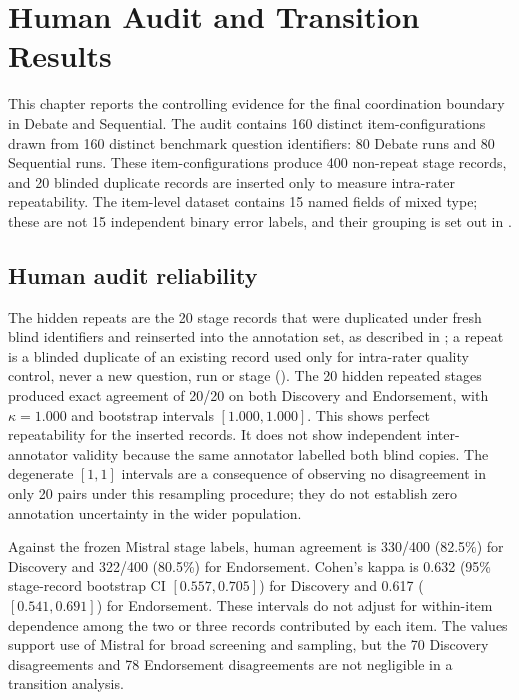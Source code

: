 \chapter{Human Audit and Transition Results}
\label{chap:human-results}

This chapter reports the controlling evidence for the final coordination boundary in Debate and Sequential. The audit contains 160 distinct item-configurations drawn from 160 distinct benchmark question identifiers: 80 Debate runs and 80 Sequential runs. These item-configurations produce 400 non-repeat stage records, and 20 blinded duplicate records are inserted only to measure intra-rater repeatability. The item-level dataset contains 15 named fields of mixed type; these are not 15 independent binary error labels, and their grouping is set out in .

\section{Human audit reliability}

The hidden repeats are the 20 stage records that were duplicated under fresh blind identifiers and reinserted into the annotation set, as described in ; a repeat is a blinded duplicate of an existing record used only for intra-rater quality control, never a new question, run or stage (). The 20 hidden repeated stages produced exact agreement of 20/20 on both Discovery and Endorsement, with $\kappa=1.000$ and bootstrap intervals $[1.000,1.000]$. This shows perfect repeatability for the inserted records. It does not show independent inter-annotator validity because the same annotator labelled both blind copies. The degenerate $[1,1]$ intervals are a consequence of observing no disagreement in only 20 pairs under this resampling procedure; they do not establish zero annotation uncertainty in the wider population.

Against the frozen Mistral stage labels, human agreement is 330/400 (82.5\%) for Discovery and 322/400 (80.5\%) for Endorsement. Cohen's kappa is 0.632 (95\% stage-record bootstrap CI $[0.557,0.705]$) for Discovery and 0.617 ($[0.541,0.691]$) for Endorsement. These intervals do not adjust for within-item dependence among the two or three records contributed by each item. The values support use of Mistral for broad screening and sampling, but the 70 Discovery disagreements and 78 Endorsement disagreements are not negligible in a transition analysis.

